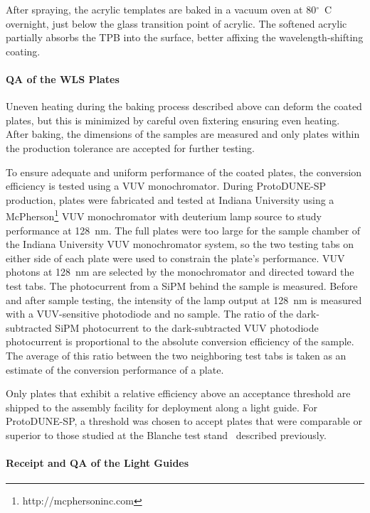 After spraying, the acrylic templates are baked in a vacuum oven at 80$^{\circ}$~C overnight, just below the glass transition point of acrylic. The softened acrylic partially absorbs the TPB into the surface, better affixing the wavelength-shifting coating.


\paragraph*{QA of the WLS Plates}

Uneven heating during the baking process described above can deform the coated plates, but this is minimized by careful oven fixtering ensuring even heating. After baking, the dimensions of the samples are measured and only plates within the production tolerance are accepted for further testing.

To ensure adequate and uniform performance of the coated plates, the conversion efficiency is tested using a VUV monochromator. During ProtoDUNE-SP production, plates were fabricated and tested at Indiana University using a McPherson\footnote{http://mcphersoninc.com} VUV monochromator with deuterium lamp source to study performance at 128~nm. The full plates were too large for the sample chamber of the Indiana University VUV monochromator system, so the two testing tabs on either side of each plate were used to constrain the plate's performance. VUV photons at 128~nm are selected by the monochromator and directed toward the test tabs. The photocurrent from a SiPM behind the sample is measured. Before and after sample testing, the intensity of the lamp output at 128~nm is measured with a VUV-sensitive photodiode and no sample. The ratio of the dark-subtracted SiPM photocurrent to the dark-subtracted VUV photodiode photocurrent is proportional to the absolute conversion efficiency of the sample. The average of this ratio between the two neighboring test tabs is taken as an estimate of the conversion performance of a plate.

Only plates that exhibit a relative efficiency above an acceptance threshold are shipped to the assembly facility for deployment along a light guide. For ProtoDUNE-SP, a threshold was chosen to accept plates that were comparable or superior to those studied at the Blanche test stand~\cite{bib:DoubleShiftLG-NIM-171113} described previously.

\paragraph*{Receipt and QA of the Light Guides}


